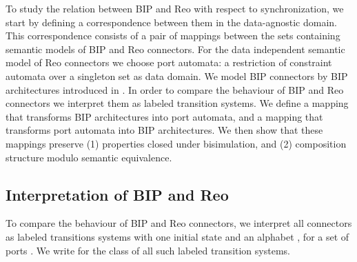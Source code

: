 \documentclass[submission,copyright,creativecommons,hidelinks]{eptcs}
\theoremstyle{plain} \newtheorem{theorem}{Theorem}
\theoremstyle{definition}
\theoremstyle{remark}
\begin{document}
To study the relation between BIP and Reo with respect to synchronization, we start by defining a correspondence between them in the data-agnostic domain. This correspondence consists of a pair of mappings between the sets containing semantic models of BIP and Reo connectors.
For the data independent semantic model of Reo connectors we choose port automata: a restriction of constraint automata over a singleton set as data domain. We model BIP connectors by BIP architectures introduced in \cite{ABBJS14}. 
In order to compare the behaviour of BIP and Reo connectors we interpret them as labeled transition systems. 
We define a mapping  that transforms BIP architectures into port automata, and a mapping  that transforms port automata into BIP architectures. 
We then show that these mappings preserve (1) properties closed under bisimulation, and (2) composition structure modulo semantic equivalence.

\subsection{Interpretation of BIP and Reo}
\label{sec:interpr_no_data}
To compare the behaviour of BIP and Reo connectors, we interpret all connectors as labeled transitions systems with one initial state and an alphabet , for a set of ports . 
We write  for the class of all such labeled transition systems. 
\end{document}
